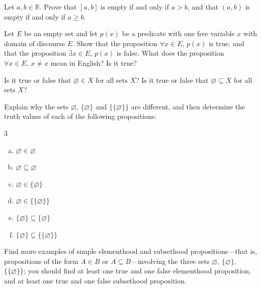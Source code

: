 \begin{exercise}
Let $a,b \in \mathbb{R}$. Prove that $[a,b]$ is empty if and only if $a > b$, and that $(a,b)$ is empty if and only if $a \ge b$.
\end{exercise}



\begin{exercise}
Let $E$ be an empty set and let $p(x)$ be a predicate with one free variable $x$ with domain of discourse $E$. Show that the proposition $\forall x \in E,\, p(x)$ is true, and that the proposition $\exists x \in E,\, p(x)$ is false. What does the proposition $\forall x \in E,\, x \ne x$ mean in English? Is it true?
\end{exercise}


\begin{exercise}
\label{exEmptySetElementSubsetOfEverySet}
Is it true or false that $\varnothing \in X$ for all sets $X$? Is it true or false that $\varnothing \subseteq X$ for all sets $X$?
\end{exercise}

\begin{exercise}
Explain why the sets $\varnothing$, $\{ \varnothing \}$ and $\{ \{ \varnothing \} \}$ are different, and then determine the truth values of each of the following propositions:
\begin{multicols}{3}
\begin{enumerate}[(a)]
\item $\varnothing \in \varnothing$
\item $\varnothing \subseteq \varnothing$
\item $\varnothing \in \{ \varnothing \}$
\item $\varnothing \in \{ \{ \varnothing \} \}$
\item $\{ \varnothing \} \subseteq \{ \varnothing \}$
\item $\{ \varnothing \} \subseteq \{ \{ \varnothing \} \}$
\end{enumerate}
\end{multicols}
Find more examples of simple elementhood and subsethood propositions---that is, propositions of the form $A \in B$ or $A \subseteq B$---involving the three sets $\varnothing$, $\{ \varnothing \}$, $\{ \{ \varnothing \} \}$; you should find at least one true and one false elementhood proposition, and at least one true and one false subsethood proposition.
\end{exercise}


